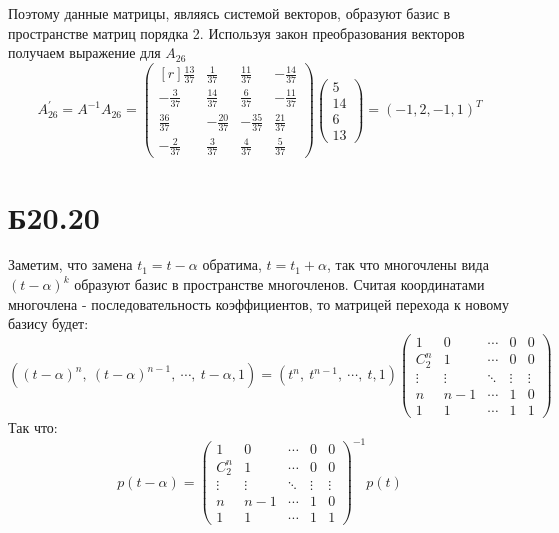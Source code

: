 Поэтому данные матрицы, являясь системой векторов, образуют базис в пространстве матриц порядка 2. Используя закон преобразования векторов получаем выражение для $A_{26}$
$$A^{'}_{26}=A^{-1}A_{26}=\begin{pmatrix*}[r]
    \frac{13}{37}&\frac{1}{37}&\frac{11}{37}&-\frac{14}{37}\\
    -\frac{3}{37}&\frac{14}{37}&\frac{6}{37}&-\frac{11}{37}\\
    \frac{36}{37}&-\frac{20}{37}&-\frac{35}{37}&\frac{21}{37}\\
    -\frac{2}{37}&\frac{3}{37}&\frac{4}{37}&\frac{5}{37}
\end{pmatrix*}\begin{pmatrix*}
    5\\
    14\\
    6\\
    13
\end{pmatrix*}=(-1,2,-1,1)^{T}$$
\section*{Б20.20}
Заметим, что замена $t_1=t-\alpha$ обратима, $t=t_1+
\alpha$, так что многочлены вида $(t-
\alpha)^k$ образуют базис в пространстве многочленов.
Считая координатами многочлена - последовательность коэффициентов, то матрицей перехода к новому базису будет:
$$((t-\alpha)^{n},\ (t-\alpha)^{n-1},\ \cdots,\ t-\alpha, 1)=
(t^{n},\ t^{n-1},\ \cdots,\ t, 1)
\begin{pmatrix*}
    1&0&\cdots&0&0\\
    C^{n}_{2}&1&\cdots&0&0\\
    \vdots&\vdots&\ddots&\vdots&\vdots\\
    n&n-1&\cdots&1&0\\
    1&1&\cdots&1&1
\end{pmatrix*}
$$
Так что:
$$p(t-\alpha)=
\begin{pmatrix*}
    1&0&\cdots&0&0\\
    C^{n}_{2}&1&\cdots&0&0\\
    \vdots&\vdots&\ddots&\vdots&\vdots\\
    n&n-1&\cdots&1&0\\
    1&1&\cdots&1&1
\end{pmatrix*}^{-1}p(t)
$$

